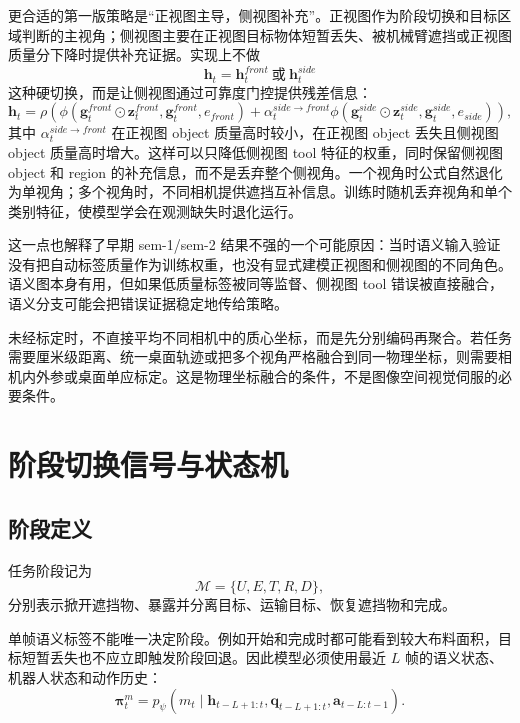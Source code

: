 \documentclass[UTF8,a4paper,11pt]{ctexart}
\begin{document}
更合适的第一版策略是“正视图主导，侧视图补充”。正视图作为阶段切换和目标区域判断的主视角；侧视图主要在正视图目标物体短暂丢失、被机械臂遮挡或正视图质量分下降时提供补充证据。实现上不做
\begin{equation}
\bm h_t=\bm h_t^{front}\ \text{或}\ \bm h_t^{side}
\end{equation}
这种硬切换，而是让侧视图通过可靠度门控提供残差信息：
\begin{equation}
\bm h_t=\rho\left(
\phi(\bm g_t^{front}\odot\bm z_t^{front},\bm g_t^{front},e_{front})
+\alpha_t^{side\rightarrow front}
\phi(\bm g_t^{side}\odot\bm z_t^{side},\bm g_t^{side},e_{side})
\right),
\end{equation}
其中 $\alpha_t^{side\rightarrow front}$ 在正视图 object 质量高时较小，在正视图 object 丢失且侧视图 object 质量高时增大。这样可以只降低侧视图 tool 特征的权重，同时保留侧视图 object 和 region 的补充信息，而不是丢弃整个侧视角。一个视角时公式自然退化为单视角；多个视角时，不同相机提供遮挡互补信息。训练时随机丢弃视角和单个类别特征，使模型学会在观测缺失时退化运行。

这一点也解释了早期 sem-1/sem-2 结果不强的一个可能原因：当时语义输入验证没有把自动标签质量作为训练权重，也没有显式建模正视图和侧视图的不同角色。语义图本身有用，但如果低质量标签被同等监督、侧视图 tool 错误被直接融合，语义分支可能会把错误证据稳定地传给策略。

未经标定时，不直接平均不同相机中的质心坐标，而是先分别编码再聚合。若任务需要厘米级距离、统一桌面轨迹或把多个视角严格融合到同一物理坐标，则需要相机内外参或桌面单应标定。这是物理坐标融合的条件，不是图像空间视觉伺服的必要条件。

\section{阶段切换信号与状态机}

\subsection{阶段定义}

任务阶段记为
\begin{equation}
\mathcal M=\{U,E,T,R,D\},
\end{equation}
分别表示掀开遮挡物、暴露并分离目标、运输目标、恢复遮挡物和完成。

单帧语义标签不能唯一决定阶段。例如开始和完成时都可能看到较大布料面积，目标短暂丢失也不应立即触发阶段回退。因此模型必须使用最近 $L$ 帧的语义状态、机器人状态和动作历史：
\begin{equation}
\bm\pi_t^m=p_\psi\left(
m_t\mid \bm h_{t-L+1:t},\bm q_{t-L+1:t},
\bm a_{t-L:t-1}\right).
\end{equation}
\end{document}
